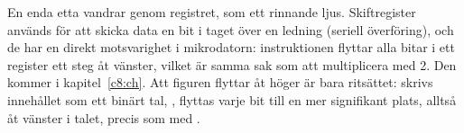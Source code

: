 En enda etta vandrar genom registret, som ett rinnande ljus. Skiftregister används för att skicka
data en bit i taget över en ledning (seriell överföring), och de har en direkt motsvarighet i
mikrodatorn: instruktionen  flyttar alla bitar i ett register ett steg åt vänster, vilket
är samma sak som att multiplicera med 2. Den kommer i kapitel~\ref{c8:ch}. Att figuren flyttar åt
höger är bara ritsättet: skrivs innehållet som ett binärt tal, , flyttas varje bit
till en mer signifikant plats, alltså åt vänster i talet, precis som med .
